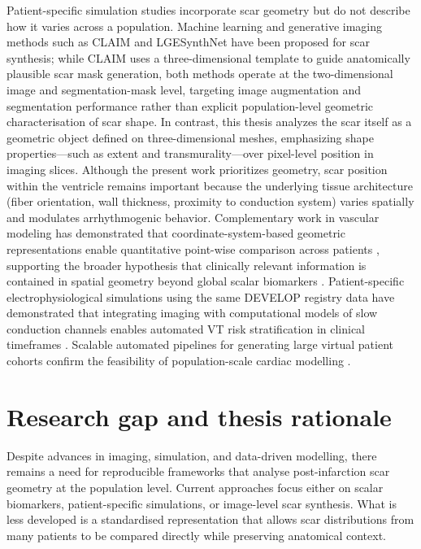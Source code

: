 Patient-specific simulation studies incorporate scar geometry but do not describe how it
varies across a population. Machine learning and generative imaging methods such as
CLAIM \cite{ramzan2025} and LGESynthNet \cite{jacob2024} have been proposed for scar
synthesis; while CLAIM uses a three-dimensional template to guide anatomically plausible scar
mask generation, both methods operate at the two-dimensional image and segmentation-mask level,
targeting image augmentation and segmentation performance rather than explicit population-level
geometric characterisation of scar shape. In contrast, this thesis analyzes the scar itself as a geometric object defined
on three-dimensional meshes, emphasizing shape properties---such as extent and
transmurality---over pixel-level position in imaging slices. Although the present work
prioritizes geometry, scar position within the ventricle remains important because the
underlying tissue architecture (fiber orientation, wall thickness, proximity to conduction
system) varies spatially and modulates arrhythmogenic behavior. Complementary work in
vascular modeling has demonstrated that coordinate-system-based geometric
representations enable quantitative point-wise comparison across patients \cite{romero2025},
supporting the broader hypothesis that clinically relevant information is contained in
spatial geometry beyond global scalar biomarkers \cite{romero2024}. Patient-specific
electrophysiological simulations using the same DEVELOP registry data have demonstrated
that integrating imaging with computational models of slow conduction channels enables
automated VT risk stratification in clinical timeframes \cite{serra2024}. Scalable automated
pipelines for generating large virtual patient cohorts confirm the feasibility of
population-scale cardiac modelling \cite{doste2026}.

\section*{Research gap and thesis rationale}

Despite advances in imaging, simulation, and data-driven modelling, there remains a need
for reproducible frameworks that analyse post-infarction scar geometry at the population
level. Current approaches focus either on scalar biomarkers, patient-specific simulations, or
image-level scar synthesis. What is less developed is a standardised representation that
allows scar distributions from many patients to be compared directly while preserving
anatomical context.

